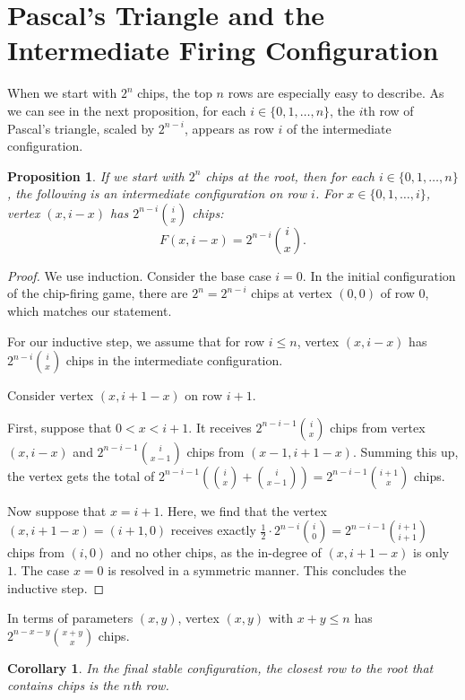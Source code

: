 \documentclass[11pt]{article}
\newtheorem{corollary}[theorem]{Corollary} %
\newtheorem{proposition}[theorem]{Proposition}
\theoremstyle{definition}
\theoremstyle{remark}
\begin{document}
\section{Pascal's Triangle and the Intermediate Firing Configuration}\label{sec:PascalTriangle}

When we start with $2^n$ chips, the top $n$ rows are especially easy to describe. As we can see in the next proposition, for each $i \in \{0, 1, \dots, n\}$, the $i$th row of Pascal's triangle, scaled by $2^{n-i}$, appears as row $i$ of the intermediate configuration.

\begin{proposition}\label{prop:PascalTriangle}
If we start with $2^n$ chips at the root, then for each $i \in \{0, 1, \dots, n\}$, the following is an intermediate configuration on row $i$. For $x \in 
 \{0, 1, \dots, i\}$, vertex $(x, i-x)$ has $2^{n-i} \binom{i}{x}$ chips:
\[F(x,i-x) = 2^{n-i} \binom{i}{x}.\]
\end{proposition}

\begin{proof}
    We use induction. Consider the base case $i=0$. In the initial configuration of the chip-firing game, there are $2^n = 2^{n-i}$ chips at vertex $(0, 0)$ of row $0$, which matches our statement. 

    For our inductive step, we assume that for row $i \le n$, vertex $(x, i-x)$ has $2^{n-i} \binom{i}{x}$ chips in the intermediate configuration. 

    Consider vertex $(x, i+1-x)$ on row $i+1$. 
    
    First, suppose that $0 < x < i+1$. It receives $2^{n-i-1}\binom{i}{x}$ chips from vertex $(x, i-x)$ and $2^{n-i-1}\binom{i}{x-1}$ chips from $(x-1, i+1-x)$. Summing this up, the vertex gets the total of $2^{n-i-1}(\binom{i}{x} + \binom{i}{x-1}) = 2^{n-i-1}\binom{i+1}{x}$ chips.

    Now suppose that $x = i+1$. Here, we find that the vertex $(x, i+1-x) = (i+1, 0)$ receives exactly $\frac{1}{2} \cdot 2^{n-i}\binom{i}{0} = 2^{n-i-1}\binom{i+1}{i+1}$ chips from $(i, 0)$ and no other chips, as the in-degree of $(x, i+1-x)$ is only $1$. The case $x=0$ is resolved in a symmetric manner. This concludes the inductive step.
    \end{proof}

In terms of parameters $(x,y)$, vertex $(x,y)$ with $x+y \le n$ has $2^{n-x-y} \binom{x+y}{x}$ chips. 


\begin{corollary}
    In the final stable configuration, the closest row to the root that contains chips is the $n$th row. 
\end{corollary}
    
\end{document}
